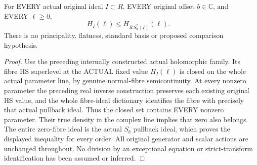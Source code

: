 \begin{theorem}
\label{hir:actual-triangular-substitution-all-order-hs-inequality}
\leanok
For EVERY actual original ideal $I\subset R$, EVERY original offset
$b\in\mathbb C$, and EVERY $\ell\ge0$,
\[
 H_I(\ell)\le H_{R\,S_b^*(I)}(\ell).
\]
There is no principality, flatness, standard basis or proposed comparison
hypothesis.
\end{theorem}
\begin{proof}
Use the preceding internally constructed actual holomorphic family. Its
fibre HS superlevel at the ACTUAL fixed value $H_I(\ell)$ is closed on
the whole actual parameter line, by genuine normal-fibre semicontinuity.
At every nonzero parameter the preceding real inverse construction
preserves each existing original HS value, and the whole fibre-ideal
dictionary identifies the fibre with precisely that actual pullback
ideal. Thus the closed set contains EVERY nonzero parameter. Their true
density in the complex line implies that zero also belongs. The entire
zero-fibre ideal is the actual $S_b$ pullback ideal, which proves the
displayed inequality for every order. All original generator and scalar
actions are unchanged throughout. No division by an exceptional equation
or strict-transform identification has been assumed or inferred.
\end{proof}

